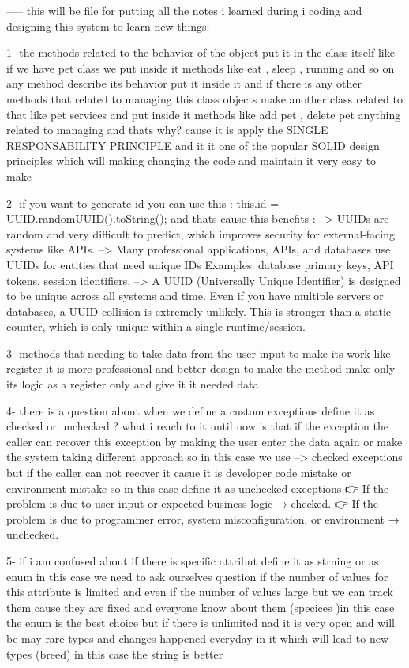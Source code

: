 -----  this will be file for putting all the notes i learned during i coding and designing this system to learn new things:

1- the methods related to the behavior of the object put it in the class itself like if we have pet class we put inside it 
methods like eat , sleep , running and so on any method describe its behavior put it inside it and if there is any other
methods that related to managing this class objects make another class related to that like pet services and put inside it 
methods like add pet , delete pet anything related to managing and thats why? cause it is apply the SINGLE RESPONSABILITY PRINCIPLE 
and it it one of the popular SOLID design principles which will making changing the code and maintain it very easy to make 


2- if you want to generate id you can use this :
this.id = UUID.randomUUID().toString();
and thats cause this benefits :
--> UUIDs are random and very difficult to predict, which improves security for external-facing systems like APIs.
--> Many professional applications, APIs, and databases use UUIDs for entities that need unique IDs
Examples: database primary keys, API tokens, session identifiers.
--> A UUID (Universally Unique Identifier) is designed to be unique across all systems and time.
Even if you have multiple servers or databases, a UUID collision is extremely unlikely.
This is stronger than a static counter, which is only unique within a single runtime/session.


3- methods that needing to take data from the user input to make its work like register it is more professional and better design to 
make the method make only its logic as a register only and give it it needed data 


4- there is a question about when we define a custom exceptions define it as checked or unchecked ?
what i reach to it until now is that if the exception the caller can recover this exception by making the user enter the data again 
or make the system taking different approach so in this case we use --> checked exceptions
but if the caller can not recover it casue it is developer code mistake or environment mistake so in this case define it as 
unchecked exceptions 
👉 If the problem is due to user input or expected business logic → checked.
👉 If the problem is due to programmer error, system misconfiguration, or environment → unchecked.


5- if i am confused about if there is specific attribut define it as strning or as enum in this case we need to ask ourselves question
if the number of values for this attribute is limited and even if the number of values large but we can track them cause they are fixed and everyone know about them 
(specices )in this case the enum is the best choice but if there is unlimited nad it is very open and will be may rare types and changes happened everyday in it 
which will lead to new  types (breed) in this case the string is better 

